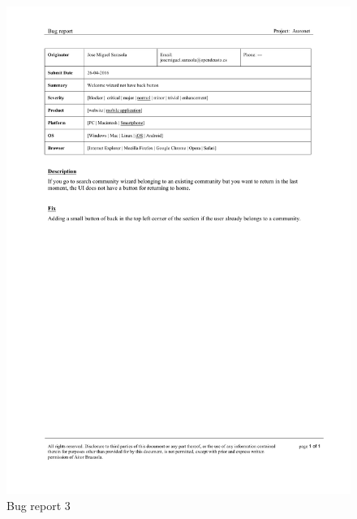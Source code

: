 \documentclass{DeustoFDP}
\begin{document}
\begin{figure}[h!]
	\centering
	\includegraphics[width=1\linewidth]{fig/Bugs/b3}
	\caption[Bug report]{Bug report 3}
	\label{fig:b3}
\end{figure}
\end{document}
